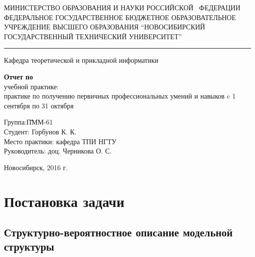 \documentclass[a4paper,12pt]{article}
\begin{document}
\begin{titlepage}

	\begin{center}
		\MakeTextUppercase{ Министерство образования и науки
			Российской ~Федерации }
		\bigbreak
		ФЕДЕРАЛЬНОЕ ГОСУДАРСТВЕННОЕ БЮДЖЕТНОЕ ОБРАЗОВАТЕЛЬНОЕ УЧРЕЖДЕНИЕ
			ВЫСШЕГО ОБРАЗОВАНИЯ
		\bigbreak
		\MakeTextUppercase{\enquote{Новосибирский государственный технический
			университет}}
		\hrule
		\bigbreak\bigbreak

		Кафедра теоретической и прикладной информатики

		\vspace{200pt}

		\textbf{\LARGE{Отчет по}\\}
		\bigbreak
		учебной практике: \\
			практике по получению первичных профессиональных умений и навыков
		\bigbreak\bigbreak
		c 1 сентября по 31 октября

		\vspace{100pt}
	\end{center}

	\begin{flushleft}
		\begin{tabbing}
			Группа:\qquad\qquad\qquad \= ПММ-61\\
			Студент:                  \> Горбунов К. К.\\
			Место практики:           \> кафедра ТПИ НГТУ\\
			Руководитель:             \> доц. Черникова О. С.\\
		\end{tabbing}
	\end{flushleft}

	\begin{center}
		\vspace{\fill}
		Новосибирск, 2016 г.
	\end{center}

\end{titlepage}

\tableofcontents

\newpage

\section{Постановка задачи}

\subsection{Структурно-вероятностное описание модельной структуры}
\end{document}
